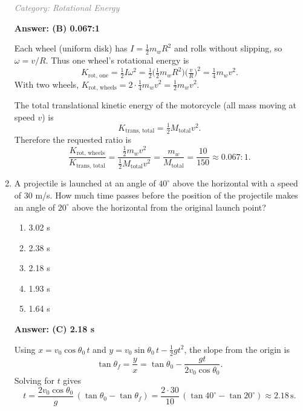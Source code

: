 \documentclass[12pt, a4paper]{article}
\makeatletter
\newif\if@categoryprinted
\newcommand{\category}[1]{\if@categoryprinted\relax\else\textit{\textcolor{gray}{Category: #1}}\global\@categoryprintedtrue\fi}
\makeatother
\begin{document}
\begin{CJK*}{UTF8}{gbsn}
\begin{enumerate}[itemsep=1.0em, topsep=0.6em]
\category{Rotational Energy}
\begin{solutionbox}
\textbf{Answer: (B) 0.067:1}

Each wheel (uniform disk) has $I=\tfrac{1}{2}m_w R^2$ and rolls without slipping, so $\omega=v/R$. Thus one wheel's rotational energy is
\[
K_{\text{rot, one}}=\tfrac{1}{2}I\omega^2=\tfrac{1}{2}\Big(\tfrac{1}{2}m_w R^2\Big)\Big(\tfrac{v}{R}\Big)^2=\tfrac{1}{4}m_w v^2.
\]
With two wheels, $K_{\text{rot, wheels}}=2\cdot\tfrac{1}{4}m_w v^2=\tfrac{1}{2}m_w v^2$.

The total translational kinetic energy of the motorcycle (all mass moving at speed $v$) is
\[
K_{\text{trans, total}}=\tfrac{1}{2}M_{\text{total}}v^2.
\]
Therefore the requested ratio is
\[
\frac{K_{\text{rot, wheels}}}{K_{\text{trans, total}}}=\frac{\tfrac{1}{2}m_w v^2}{\tfrac{1}{2}M_{\text{total}}v^2}=\frac{m_w}{M_{\text{total}}}=\frac{10}{150}\approx0.067:1.
\]
\end{solutionbox}

\newpage

\item \label{prob:39}
A projectile is launched at an angle of $40^\circ$ above the horizontal with a speed of 30 m/s. How much time passes before the position of the projectile makes an angle of $20^\circ$ above the horizontal from the original launch point?
\begin{enumerate}[label=(\Alph*)]
    \item 3.02 s
    \item 2.38 s
    \item 2.18 s
    \item 1.93 s
    \item 1.64 s
\end{enumerate}

\category{Kinematics}
\begin{solutionbox}
\textbf{Answer: (C) 2.18 s}

Using $x=v_0\cos\theta_0\,t$ and $y=v_0\sin\theta_0\,t-\tfrac12gt^2$, the slope from the origin is
\[
\tan\theta_f=\frac{y}{x}=\tan\theta_0-\frac{g t}{2 v_0\cos\theta_0}.
\]
Solving for $t$ gives
\[
t=\frac{2 v_0 \cos\theta_0}{g}\,(\tan\theta_0-\tan\theta_f)=\frac{2\cdot30}{10}\,(\tan40^\circ-\tan20^\circ)\approx2.18\,\text{s}.
\]
\end{solutionbox}

\end{enumerate}
\end{CJK*}
\end{document}
